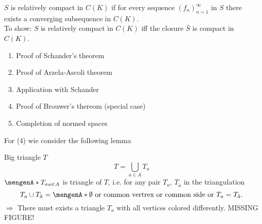 $S$ is relatively compact in $C(K)$ if for every sequence $(f_n)_{n=1}^{\infty}$ in $S$ there exists a converging subsequence in $C(K)$. \\
To show:
$S$ is relatively compact in $C(K)$ iff the closure $\bar{S}$ is compact in $C(K)$. 
\begin{enumerate}[(1)]
	\item Proof of Schander's theorem
	\item Proof of Arzela-Ascoli theorem
	\item Application with Schander
	\item Proof of Brouwer's thereom (special case)
	\item Completion of normed spaces
\end{enumerate}	
For (4) wie consider the following lemma
\begin{lemma*}
	Big triangle $T$ 
	\[
		T = \bigcup_{a \in A} T_a
	\]
	$\set{T_a}_{a \in A}$ is triangle of $T$, i.e. for any pair $T_a$, $T_{\tilde a}$ in the triangulation
	\[
		T_a \cup T_{\tilde a}= \set{\emptyset \text{ or common vertrex or common side or }T_a = T_{\tilde a}}.
	\]
	$\Rightarrow $ There must exists a triangle $T_a$ with all vertices colored differently. MISSING FIGURE!
\end{lemma*}

